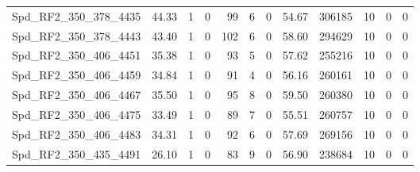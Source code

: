\begin{longtable}[c]{@{}lrrrrrrrrrrr@{}}
Spd\_RF2\_350\_378\_4435      & 44.33                  & 1                       & 0                       & 99                     & 6                       & 0                       & 54.67                   & 306185                   & 10                       & 0                        & 0                        \\
Spd\_RF2\_350\_378\_4443      & 43.40                  & 1                       & 0                       & 102                    & 6                       & 0                       & 58.60                   & 294629                   & 10                       & 0                        & 0                        \\
Spd\_RF2\_350\_406\_4451      & 35.38                  & 1                       & 0                       & 93                     & 5                       & 0                       & 57.62                   & 255216                   & 10                       & 0                        & 0                        \\
Spd\_RF2\_350\_406\_4459      & 34.84                  & 1                       & 0                       & 91                     & 4                       & 0                       & 56.16                   & 260161                   & 10                       & 0                        & 0                        \\
Spd\_RF2\_350\_406\_4467      & 35.50                  & 1                       & 0                       & 95                     & 8                       & 0                       & 59.50                   & 260380                   & 10                       & 0                        & 0                        \\
Spd\_RF2\_350\_406\_4475      & 33.49                  & 1                       & 0                       & 89                     & 7                       & 0                       & 55.51                   & 260757                   & 10                       & 0                        & 0                        \\
Spd\_RF2\_350\_406\_4483      & 34.31                  & 1                       & 0                       & 92                     & 6                       & 0                       & 57.69                   & 269156                   & 10                       & 0                        & 0                        \\
Spd\_RF2\_350\_435\_4491      & 26.10                  & 1                       & 0                       & 83                     & 9                       & 0                       & 56.90                   & 238684                   & 10                       & 0                        & 0                        \\

\end{longtable}
